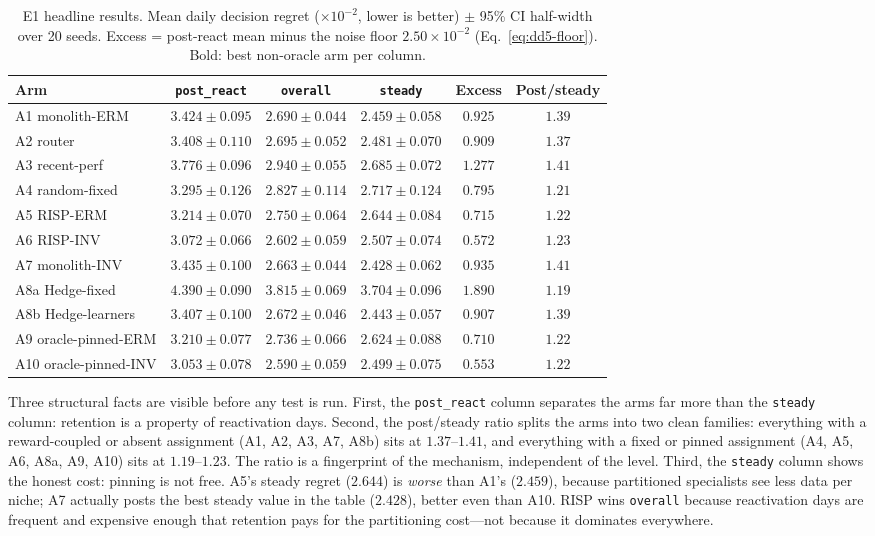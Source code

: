 \documentclass[11pt,a4paper]{article}
\theoremstyle{definition}
\theoremstyle{plain}
\begin{document}
\begin{table}[h]
\centering
\caption{E1 headline results. Mean daily decision regret ($\times 10^{-2}$,
lower is better) $\pm$ 95\% CI half-width over 20 seeds. Excess = post-react
mean minus the noise floor $2.50 \times 10^{-2}$
(Eq.~\eqref{eq:dd5-floor}). Bold: best non-oracle arm per column.}
\label{tab:dd5-e1-main}
\small
\begin{tabular}{lccccc}
\toprule
Arm & \texttt{post\_react} & \texttt{overall} & \texttt{steady} &
Excess & Post/steady \\
\midrule
A1 monolith-ERM      & $3.424 \pm 0.095$ & $2.690 \pm 0.044$ & $2.459 \pm 0.058$ & $0.925$ & $1.39$ \\
A2 router            & $3.408 \pm 0.110$ & $2.695 \pm 0.052$ & $2.481 \pm 0.070$ & $0.909$ & $1.37$ \\
A3 recent-perf       & $3.776 \pm 0.096$ & $2.940 \pm 0.055$ & $2.685 \pm 0.072$ & $1.277$ & $1.41$ \\
A4 random-fixed      & $3.295 \pm 0.126$ & $2.827 \pm 0.114$ & $2.717 \pm 0.124$ & $0.795$ & $1.21$ \\
A5 RISP-ERM      & $3.214 \pm 0.070$ & $2.750 \pm 0.064$ & $2.644 \pm 0.084$ & $0.715$ & $1.22$ \\
A6 RISP-INV      & $\mathbf{3.072 \pm 0.066}$ & $\mathbf{2.602 \pm 0.059}$ & $2.507 \pm 0.074$ & $\mathbf{0.572}$ & $1.23$ \\
A7 monolith-INV      & $3.435 \pm 0.100$ & $2.663 \pm 0.044$ & $\mathbf{2.428 \pm 0.062}$ & $0.935$ & $1.41$ \\
A8a Hedge-fixed      & $4.390 \pm 0.090$ & $3.815 \pm 0.069$ & $3.704 \pm 0.096$ & $1.890$ & $1.19$ \\
A8b Hedge-learners   & $3.407 \pm 0.100$ & $2.672 \pm 0.046$ & $2.443 \pm 0.057$ & $0.907$ & $1.39$ \\
\midrule
A9 oracle-pinned-ERM & $3.210 \pm 0.077$ & $2.736 \pm 0.066$ & $2.624 \pm 0.088$ & $0.710$ & $1.22$ \\
A10 oracle-pinned-INV& $3.053 \pm 0.078$ & $2.590 \pm 0.059$ & $2.499 \pm 0.075$ & $0.553$ & $1.22$ \\
\bottomrule
\end{tabular}
\end{table}

Three structural facts are visible before any test is run. First, the
\texttt{post\_react} column separates the arms far more than the
\texttt{steady} column: retention is a property of reactivation days.
Second, the post/steady ratio splits the arms into two clean families:
everything with a reward-coupled or absent assignment (A1, A2, A3, A7, A8b)
sits at $1.37$--$1.41$, and everything with a fixed or pinned assignment
(A4, A5, A6, A8a, A9, A10) sits at $1.19$--$1.23$. The ratio is a
fingerprint of the mechanism, independent of the level. Third, the
\texttt{steady} column shows the honest cost: pinning is not free. A5's
steady regret ($2.644$) is \emph{worse} than A1's ($2.459$), because
partitioned specialists see less data per niche; A7 actually posts the best
steady value in the table ($2.428$), better even than A10. RISP wins
\texttt{overall} because reactivation days are frequent and expensive enough
that retention pays for the partitioning cost---not because it dominates
everywhere.
\end{document}
